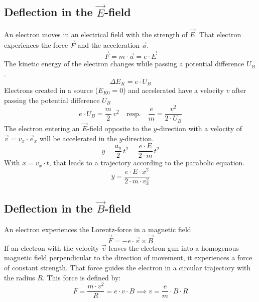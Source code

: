 \documentclass{tudphygp_eng}
\begin{document}
\subsection{Deflection in the $\vec E$-field}
  An electron moves in an electrical field with the strength of $\vec E$. That electron experiences the force $\vec F$ and the acceleration $\vec a$.
  \begin{equation}
    \vec F = m\cdot\vec a = e\cdot\vec E
  \end{equation}
  The kinetic energy of the electron changes while passing a potential difference $U_B$.
  \begin{equation}
    \Delta E_K = e\cdot U_B
  \end{equation}
  Electrons created in a source ($E_{K0} = 0$) and accelerated have a velocity 
  $v$ after passing the potential difference $U_B$
  \begin{equation}
    e\cdot U_B = \frac{m}{2}\,v^2 \quad\text{resp.}\quad \frac{e}{m} = \frac{v^2}{2\cdot U_B}
    \label{for:E-Feld}
  \end{equation}
  The electron entering an $\vec E$-field opposite to the $y$-direction with a velocity of $\vec v = v_x\cdot \vec e_x$ 
  will be accelerated in the $y$-direction.
  \begin{equation}
    y=\frac{a_y}{2}\,t^2 = \frac{e\cdot E}{2\cdot m}\,t^2
  \end{equation}
  With $x = v_x\cdot t$, that leads to a trajectory according to the parabolic equation.
  \begin{equation}
    y=\frac{e\cdot E\cdot x^2}{2\cdot m\cdot v_x^2}
    \label{for:parabelgleichung}
  \end{equation}

\subsection{Deflection in the $\vec B$-field}
  An electron experiences the Lorentz-force in a magnetic field
  \begin{equation}
    \vec F = -e\cdot \vec v \times \vec B
  \end{equation}
  If an electron with the velocity $\vec v$ leaves the electron gun into a homogenous magnetic field perpendicular to the direction of movement, it experiences a force of constant strength. That force guides the electron in a circular trajectory with the radius $R$.
  This force is defined by:
  \begin{equation}
    F = \frac{m\cdot v^2}{R} = e\cdot v\cdot B \implies v = \frac{e}{m}\cdot B\cdot R
    \label{for:B-Feld}
  \end{equation}
  
\end{document}
